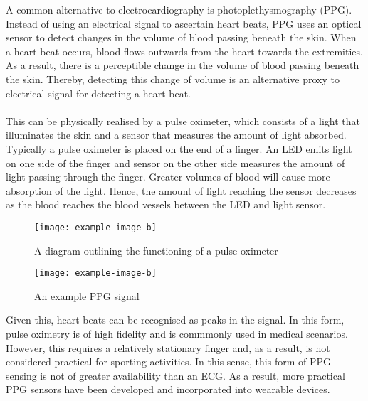A common alternative to electrocardiography is photoplethysmography (PPG).
Instead of using an electrical signal to ascertain heart beats, PPG uses an optical sensor to detect changes in the volume of blood passing beneath the skin.
When a heart beat occurs, blood flows outwards from the heart towards the extremities. As a result, there is a perceptible change in the volume of blood passing beneath the skin. Thereby, detecting this change of volume is an alternative proxy to electrical signal for detecting a heart beat.
\\\\
This can be physically realised by a pulse oximeter, which consists of a light that illuminates the skin and a sensor that measures the amount of light absorbed. Typically a pulse oximeter is placed on the end of a finger. An LED emits light on one side of the finger and sensor on the other side measures the amount of light passing through the finger.
Greater volumes of blood will cause more absorption of the light. 
Hence, the amount of light reaching the sensor decreases as the blood reaches the blood vessels between the LED and light sensor.
\begin{figure}[H]
    \texttt{[image: example-image-b]}
   \caption{A diagram outlining the functioning of a pulse oximeter} 
\end{figure}
\noindent
\begin{figure}[H]
    \texttt{[image: example-image-b]}
   \caption{An example PPG signal} 
\end{figure}
\noindent
Given this, heart beats can be recognised as peaks in the signal. In this form, pulse oximetry is of high fidelity and is commmonly used in medical scenarios.
However, this requires a relatively stationary finger and, as a result, is not considered practical for sporting activities. In this sense, this form of PPG sensing is not of greater availability than an ECG. As a result, more practical PPG sensors have been developed and incorporated into wearable devices. 

